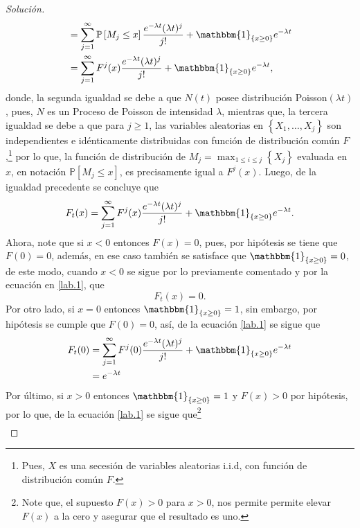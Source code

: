 \documentclass[10.5pt,notitlepage]{article}
\newenvironment{solucion}
  {\begin{proof}[Solución]}
  {\end{proof}}
\newcommand{\PP}{\mathbb{P}}
\newcommand{\corch}[1]{\left[ #1 \right]}
\newcommand{\kis}[1]{\left\{ #1 \right\}}
\theoremstyle{plain}
\begin{document}
\begin{solucion}
\begin{align*}
               &=  \sum_{j = 1}^{\infty}\PP\corch{M_{j}\leq x}\frac{e^{-\lambda t} (\lambda t)^{j}}{j!} + \mathbbm{1}_{\kis{x \geq 0}}e^{-\lambda t}\\
               &=  \sum_{j = 1}^{\infty}F^{j}(x)\frac{e^{-\lambda t} (\lambda t)^{j}}{j!} + \mathbbm{1}_{\kis{x \geq 0}}e^{-\lambda t},
\end{align*}
donde, la segunda igualdad se debe a que \(N(t)\) posee distribución Poisson\((\lambda t)\), pues, \(N\) es un Proceso de Poisson de intensidad \(\lambda\), mientras que, la tercera igualdad se debe a que para \(j\geq 1\), las variables aleatorias en \(\kis{X_{1}, \hdots, X_{j}}\) son independientes e idénticamente distribuidas con función de distribución común \(F\),\footnote{Pues, \(X\) es una secesión de variables aleatorias i.i.d, con función de distribución común \(F\).} por lo que, la función de distribución de \(M_{j} = \max_{1 \leq i \leq j}\kis{X_{j}}\) evaluada en \(x\), en notación \(\PP[M_{j} \leq x]\), es precisamente igual a \(F^{j}(x)\). Luego, de la igualdad precedente se concluye que
\begin{equation}\label{lab.1}
     F_{t}(x) = \sum_{j = 1}^{\infty}F^{j}(x)\frac{e^{-\lambda t} (\lambda t)^{j}}{j!} + \mathbbm{1}_{\kis{x \geq 0}}e^{-\lambda t}.
\end{equation}
Ahora, note que si \(x < 0\) entonces \(F(x) = 0\), pues, por hipótesis se tiene que \(F(0) = 0\), además, en ese caso también se satisface que \(\mathbbm{1}_{\kis{x\geq 0}} = 0\), de este modo, cuando \(x < 0\) se sigue por lo previamente comentado y por la ecuación en \eqref{lab.1}, que  
\begin{equation}\label{lab.2}
 F_{t}(x) = 0.    
\end{equation}
Por otro lado, si \(x = 0\) entonces \(\mathbbm{1}_{\kis{x \geq 0}} = 1\), sin embargo, por hipótesis se cumple que \(F(0) = 0\), así, de la ecuación \eqref{lab.1} se sigue que 
\begin{align}\label{lab.21}
     F_{t}(0) &= \sum_{j = 1}^{\infty}F^{j}(0)\frac{e^{-\lambda t} (\lambda t)^{j}}{j!} + \mathbbm{1}_{\kis{x \geq 0}}e^{-\lambda t} \nonumber\\ 
              &= e^{- \lambda t}
\end{align}
Por último, si \(x > 0\) entonces \(\mathbbm{1}_{\kis{x \geq 0}} = 1\) y \(F(x)> 0\) por hipótesis, por lo que, de la ecuación \eqref{lab.1} se sigue que\footnote{Note que, el supuesto \(F(x) > 0\) para \(x > 0\), nos permite permite elevar \(F(x)\) a la cero y asegurar que el resultado es uno.} 
\begin{align}

\end{align}
\end{solucion}
\end{document}
